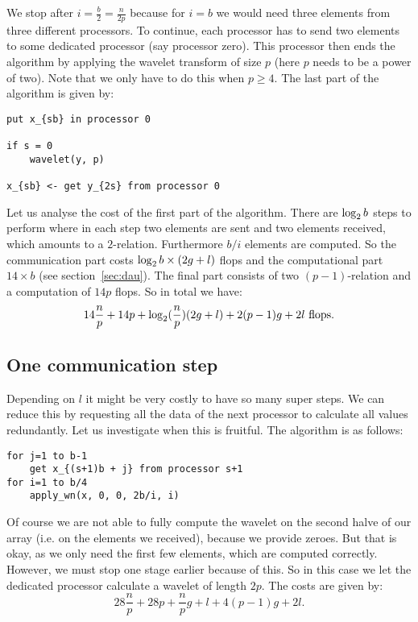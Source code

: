 We stop after $i=\frac{b}{2}=\frac{n}{2p}$ because for $i=b$ we would need three elements from three different processors. To continue, each processor has to send two elements to some dedicated processor (say processor zero). This processor then ends the algorithm by applying the wavelet transform of size $p$ (here $p$ needs to be a power of two). Note that we only have to do this when $p \geq 4$. The last part of the algorithm is given by:

\begin{lstlisting}
put x_{sb} in processor 0

if s = 0
	wavelet(y, p)

x_{sb} <- get y_{2s} from processor 0
\end{lstlisting}

Let us analyse the cost of the first part of the algorithm. There are $\operatorname{\log_2}{b}$ steps to perform where in each step two elements are sent and two elements received, which amounts to a $2$-relation. Furthermore $b/i$ elements are computed. So the communication part costs $\operatorname{\log_2}{b}\times(2g+l)$ flops and the computational part $14 \times b$ (see section~\ref{sec:dau}). The final part consists of two $(p-1)$-relation and a computation of $14p$ flops. So in total we have:
\[ 14\frac{n}{p} + 14p + \operatorname{\log_2}(\frac{n}{p})(2g + l) + 2(p-1)g + 2l \text{ flops}.\]


\subsection{One communication step}
Depending on $l$ it might be very costly to have so many super steps. We can reduce this by requesting all the data of the next processor to calculate all values redundantly. Let us investigate when this is fruitful. The algorithm is as follows:

\begin{lstlisting}
for j=1 to b-1
	get x_{(s+1)b + j} from processor s+1
for i=1 to b/4
	apply_wn(x, 0, 0, 2b/i, i)
\end{lstlisting}

Of course we are not able to fully compute the wavelet on the second halve of our array (i.e. on the elements we received), because we provide zeroes. But that is okay, as we only need the first few elements, which are computed correctly. However, we must stop one stage earlier because of this. So in this case we let the dedicated processor calculate a wavelet of length $2p$. The costs are given by:
\[ 28\frac{n}{p} + 28p + \frac{n}{p}g + l + 4(p-1)g + 2l. \]

